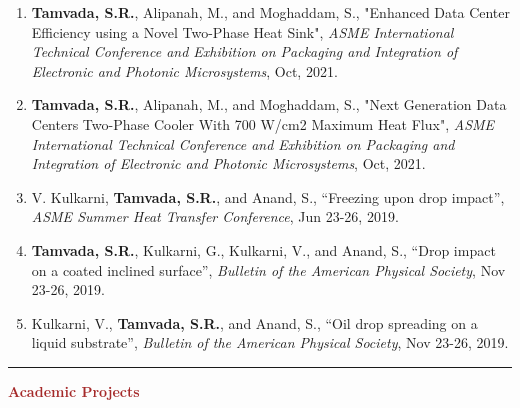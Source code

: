 \documentclass[11pt, letterpaper]{article}
\begin{document}
\begin{enumerate}[leftmargin=*]
\setlength\itemsep{-1pt}
\vspace{-8pt}
\item \textbf{Tamvada, S.R.}, Alipanah, M., and Moghaddam, S., "Enhanced Data Center Efficiency using a Novel Two-Phase Heat Sink", \textit{ASME International Technical Conference and Exhibition on Packaging and Integration of Electronic and Photonic Microsystems}, Oct, 2021.
\item \textbf{Tamvada, S.R.}, Alipanah, M., and Moghaddam, S., "Next Generation Data Centers Two-Phase Cooler With 700 W/cm2 Maximum Heat Flux", \textit{ASME International Technical Conference and Exhibition on Packaging and Integration of Electronic and Photonic Microsystems}, Oct, 2021.
\item V. Kulkarni, \textbf{Tamvada, S.R.}, and Anand, S., ``Freezing upon drop impact'', \textit{ASME Summer Heat Transfer Conference}, Jun 23-26, 2019.
\item \textbf{Tamvada, S.R.}, Kulkarni, G., Kulkarni, V., and Anand, S., ``Drop impact on a coated inclined surface'', \textit{Bulletin of the American Physical Society}, Nov 23-26, 2019.
\item Kulkarni, V., \textbf{Tamvada, S.R.}, and Anand, S., ``Oil drop spreading on a liquid substrate'', \textit{Bulletin of the American Physical Society}, Nov 23-26, 2019.
\end{enumerate}
\vspace{-10pt}
\noindent \rule[2pt]{\textwidth}{0.5pt}
\noindent \textbf{\large \textcolor{Brown}{Academic Projects}}\\
\end{document}
